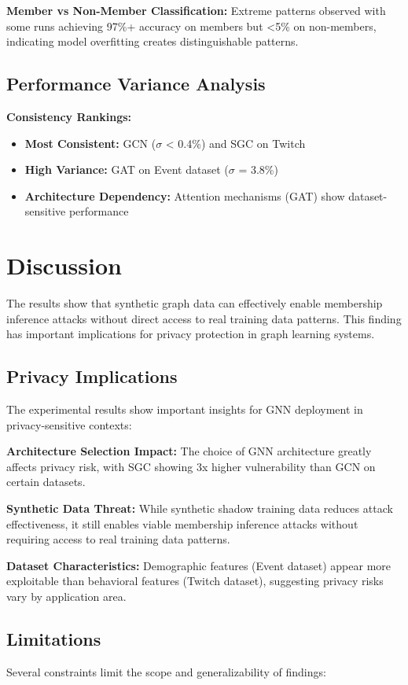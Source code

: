 \documentclass{article}
\begin{document}
\textbf{Member vs Non-Member Classification:} Extreme patterns observed with some runs achieving 97\%+ accuracy on members but <5\% on non-members, indicating model overfitting creates distinguishable patterns.

\subsection{Performance Variance Analysis}
\textbf{Consistency Rankings:}
\begin{itemize}
\item \textbf{Most Consistent:} GCN ($\sigma$ < 0.4\%) and SGC on Twitch
\item \textbf{High Variance:} GAT on Event dataset ($\sigma$ = 3.8\%)
\item \textbf{Architecture Dependency:} Attention mechanisms (GAT) show dataset-sensitive performance
\end{itemize}

\section{Discussion}
The results show that synthetic graph data can effectively enable membership inference attacks without direct access to real training data patterns. This finding has important implications for privacy protection in graph learning systems.

\subsection{Privacy Implications}
The experimental results show important insights for GNN deployment in privacy-sensitive contexts:

\textbf{Architecture Selection Impact:} The choice of GNN architecture greatly affects privacy risk, with SGC showing 3x higher vulnerability than GCN on certain datasets.

\textbf{Synthetic Data Threat:} While synthetic shadow training data reduces attack effectiveness, it still enables viable membership inference attacks without requiring access to real training data patterns.

\textbf{Dataset Characteristics:} Demographic features (Event dataset) appear more exploitable than behavioral features (Twitch dataset), suggesting privacy risks vary by application area.


\subsection{Limitations}
Several constraints limit the scope and generalizability of findings:
\end{document}
